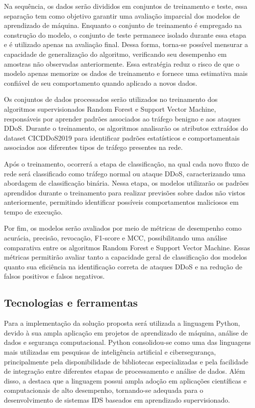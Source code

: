 \documentclass[
    12pt,                %
    openright,           %
    oneside,             %
    a4paper,             %
    english,             %
    brazil               %
]{abntex2}
\begin{document}
Na sequência, os dados serão divididos em conjuntos de treinamento e teste, essa separação tem como objetivo garantir uma avaliação imparcial dos modelos de aprendizado de máquina. Enquanto o conjunto de treinamento é empregado na construção do modelo, o conjunto de teste permanece isolado durante essa etapa e é utilizado apenas na avaliação final. Dessa forma, torna-se possível mensurar a capacidade de generalização do algoritmo, verificando seu desempenho em amostras não observadas anteriormente. Essa estratégia reduz o risco de que o modelo apenas memorize os dados de treinamento e fornece uma estimativa mais confiável de seu comportamento quando aplicado a novos dados.

Os conjuntos de dados processados serão utilizados no treinamento dos algoritmos supervisionados Random Forest e Support Vector Machine, responsáveis por aprender padrões associados ao tráfego benigno e aos ataques DDoS. Durante o treinamento, os algoritmos analisarão os atributos extraídos do dataset CICDDoS2019 para identificar padrões estatísticos e comportamentais associados aos diferentes tipos de tráfego presentes na rede.

Após o treinamento, ocorrerá a etapa de classificação, na qual cada novo fluxo de rede será classificado como tráfego normal ou ataque DDoS, caracterizando uma abordagem de classificação binária. Nessa etapa, os modelos utilizarão os padrões aprendidos durante o treinamento para realizar previsões sobre dados não vistos anteriormente, permitindo identificar possíveis comportamentos maliciosos em tempo de execução.

Por fim, os modelos serão avaliados por meio de métricas de desempenho como acurácia, precisão, revocação, F1-score e MCC, possibilitando uma análise comparativa entre os algoritmos Random Forest e Support Vector Machine. Essas métricas permitirão avaliar tanto a capacidade geral de classificação dos modelos quanto sua eficiência na identificação correta de ataques DDoS e na redução de falsos positivos e falsos negativos.

\subsection{Tecnologias e ferramentas} Para a implementação da solução proposta será utilizada a linguagem Python, devido à sua ampla aplicação em projetos de aprendizado de máquina, análise de dados e segurança computacional. Python consolidou-se como uma das linguagens mais utilizadas em pesquisas de inteligência artificial e cibersegurança, principalmente pela disponibilidade de bibliotecas especializadas e pela facilidade de integração entre diferentes etapas de processamento e análise de dados. Além disso, a  destaca que a linguagem possui ampla adoção em aplicações científicas e computacionais de alto desempenho, tornando-se adequada para o desenvolvimento de sistemas IDS baseados em aprendizado supervisionado.
\end{document}
